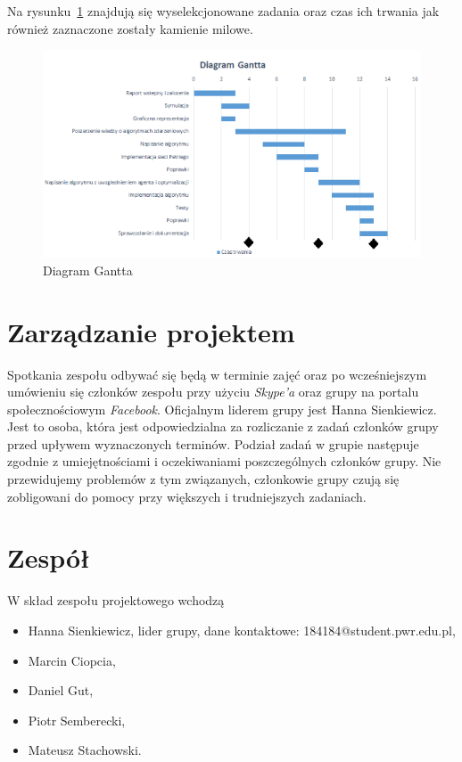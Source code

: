 \documentclass[10pt, a4paper]{article}
\begin{document}
Na rysunku~\ref{fig:gantt} znajdują się wyselekcjonowane zadania oraz czas ich trwania jak również zaznaczone zostały kamienie milowe. 
 \begin{figure}[H]
  \begin{center}
    \includegraphics[width=1\textwidth]{./obrazki/gantt.png}
    \caption{Diagram Gantta}
    \label{fig:gantt}
  \end{center}
 \end{figure}

\section{Zarządzanie projektem}

Spotkania zespołu odbywać się będą w terminie zajęć oraz po wcześniejszym umówieniu się członków zespołu przy użyciu \textit{Skype’a} oraz grupy na portalu społecznościowym \textit{Facebook}. Oficjalnym liderem grupy jest Hanna Sienkiewicz. Jest to osoba, która jest odpowiedzialna za rozliczanie z zadań członków grupy przed upływem wyznaczonych terminów. Podział zadań w grupie następuje zgodnie z umiejętnościami i oczekiwaniami poszczególnych członków grupy. Nie przewidujemy problemów z tym związanych, członkowie grupy czują się zobligowani do pomocy przy większych i trudniejszych zadaniach. 

\section{Zespół}

W skład zespołu projektowego wchodzą
\begin{itemize}
\item Hanna Sienkiewicz, lider grupy, dane kontaktowe: 184184@student.pwr.edu.pl,
\item Marcin Ciopcia,
\item Daniel Gut,
\item Piotr Semberecki,
\item Mateusz Stachowski.
\end{itemize}
\end{document}
